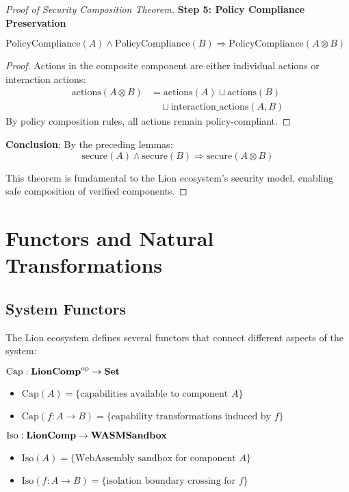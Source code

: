 \begin{proof}[Proof of Security Composition Theorem]
\textbf{Step 5: Policy Compliance Preservation}

\begin{lemma}
$\text{PolicyCompliance}(A) \land \text{PolicyCompliance}(B) \Rightarrow \text{PolicyCompliance}(A \otimes B)$
\end{lemma}

\begin{proof}
Actions in the composite component are either individual actions or interaction actions:
\begin{align}
\text{actions}(A \otimes B) &= \text{actions}(A) \sqcup \text{actions}(B) \nonumber \\
&\quad \sqcup \text{interaction\_actions}(A, B)
\end{align}
By policy composition rules, all actions remain policy-compliant.
\end{proof}

\textbf{Conclusion}: By the preceding lemmas:
\begin{equation}
\text{secure}(A) \land \text{secure}(B) \Rightarrow \text{secure}(A \otimes B)
\end{equation}

This theorem is fundamental to the Lion ecosystem's security model, enabling safe composition of verified components.
\end{proof}

\section{Functors and Natural Transformations}

\subsection{System Functors}

The Lion ecosystem defines several functors that connect different aspects of the system:

\begin{definition}
$\text{Cap}: \mathbf{LionComp}^{\text{op}} \to \mathbf{Set}$
\begin{itemize}
\item $\text{Cap}(A) = \{\text{capabilities available to component } A\}$
\item $\text{Cap}(f: A \to B) = \{\text{capability transformations induced by } f\}$
\end{itemize}
\end{definition}

\begin{definition}
$\text{Iso}: \mathbf{LionComp} \to \mathbf{WASMSandbox}$
\begin{itemize}
\item $\text{Iso}(A) = \{\text{WebAssembly sandbox for component } A\}$
\item $\text{Iso}(f: A \to B) = \{\text{isolation boundary crossing for } f\}$
\end{itemize}
\end{definition}

